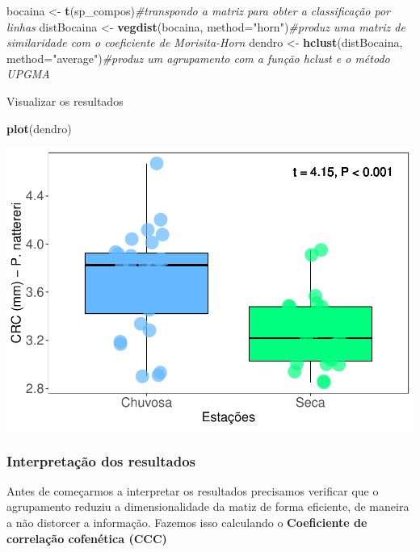 \documentclass[
]{book}
\newenvironment{Shaded}{\begin{snugshade}}{\end{snugshade}}
\newcommand{\CommentTok}[1]{\textcolor[rgb]{0.56,0.35,0.01}{\textit{#1}}}
\newcommand{\DataTypeTok}[1]{\textcolor[rgb]{0.13,0.29,0.53}{#1}}
\newcommand{\KeywordTok}[1]{\textcolor[rgb]{0.13,0.29,0.53}{\textbf{#1}}}
\newcommand{\NormalTok}[1]{#1}
\newcommand{\StringTok}[1]{\textcolor[rgb]{0.31,0.60,0.02}{#1}}
\begin{document}
\begin{Shaded}
\begin{Highlighting}[]
\NormalTok{bocaina <-}\StringTok{ }\KeywordTok{t}\NormalTok{(sp_compos)}\CommentTok{#transpondo a matriz para obter a classificação por linhas}
\NormalTok{distBocaina <-}\StringTok{ }\KeywordTok{vegdist}\NormalTok{(bocaina, }\DataTypeTok{method=}\StringTok{"horn"}\NormalTok{)}\CommentTok{#produz uma matriz de similaridade com o coeficiente de Morisita-Horn}
\NormalTok{dendro <-}\StringTok{ }\KeywordTok{hclust}\NormalTok{(distBocaina, }\DataTypeTok{method=}\StringTok{"average"}\NormalTok{)}\CommentTok{#produz um agrupamento com a função hclust e o método UPGMA}
\end{Highlighting}
\end{Shaded}

Visualizar os resultados

\begin{Shaded}
\begin{Highlighting}[]
\KeywordTok{plot}\NormalTok{(dendro)}
\end{Highlighting}
\end{Shaded}

\includegraphics{livro_r_ecologia_files/figure-latex/unnamed-chunk-2-1.pdf}

\hypertarget{interpretauxe7uxe3o-dos-resultados}{%
\subsubsection{Interpretação dos resultados}\label{interpretauxe7uxe3o-dos-resultados}}

Antes de começarmos a interpretar os resultados precisamos verificar que o agrupamento reduziu a dimensionalidade da matiz de forma eficiente, de maneira a não distorcer a informação. Fazemos isso calculando o \textbf{Coeficiente de correlação cofenética (CCC)}
\end{document}
